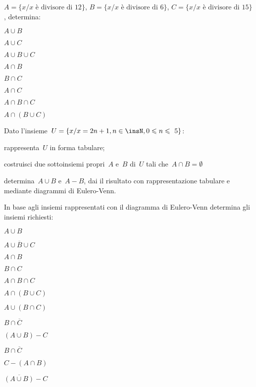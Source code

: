 \begin{esercizio}
\label{ese:7.88}
\(A=\{x/ x\text{ è divisore di }12\}\), \(B=\{x / x\text{ è divisore di }6\}\),
\(C=\{x / x\text{ è divisore di~15}\}\), determina:
\begin{multicols}{4}
 \begin{enumeratea}
 \item \(A\cup B\)
 \item \(A\cup C\)
 \item \(A\cup B\cup C\)
 \item \(A\cap B\)
 \item \(B\cap C\)
 \item \(A\cap C\)
 \item \(A\cap B\cap C\)
 \item \(A\cap(B\cup C)\)
 \end{enumeratea}
\end{multicols}
\end{esercizio}

\begin{esercizio}
\label{ese:7.89}
Dato l'insieme~\(U=\{x/x=2n+1,n\in\insN,0\leqslant n\leqslant~5\}\):

\begin{enumeratea}
\item rappresenta~\(U\) in forma tabulare;
\item costruisci due sottoinsiemi propri~\(A\) e~\(B\) di~\(U\) tali che~\(A\cap 
B=\emptyset \)
\item determina~\(A\cup B\) e~\(A-B\), dai il risultato con rappresentazione 
tabulare e mediante diagrammi di
Eulero-Venn.
\end{enumeratea}
\end{esercizio}

\begin{esercizio}
\label{ese:7.90}
In base agli insiemi rappresentati con il diagramma di Eulero-Venn determina gli 
insiemi richiesti:
\begin{multicols}{2}
\begin{enumeratea}
\item \(A\cup B\)
\item \(\overline{{A\cup B\cup C}}\)
\item \(A\cap B\)
\item \(B\cap C\)
\item \(A\cap B\cap C\)
\item \(A\cap (B\cup C)\)
\item \(A\cup (B\cap C)\)
\item \(B\cap \overline{C}\)
\item \((A\cup B)-C\)
\item \(B\cap \overline{C}\)
\item \(C-(A\cap B)\)
\item \(\overline{{(A\cup B)}}-C\)
\end{enumeratea}
\begin{center}
 
\end{center}
\end{multicols}
\end{esercizio}

